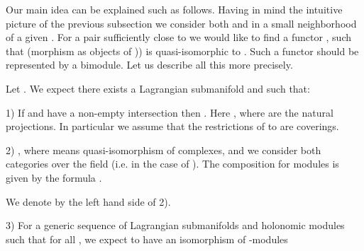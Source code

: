 \documentclass[a4paper,12pt]{article}
\begin{document}
Our main idea can be explained such as follows. Having in mind the intuitive picture of the previous
subsection we consider both \coordHE{} and \coordHE{} in a small
neighborhood of a given \coordHE{}. For a pair \coordHE{} sufficiently close to
\coordHE{} we would like to find a functor 
\coordHE{}, such
that \coordHE{} (morphism as objects of
\coordHE{})) is quasi-isomorphic to \coordHE{}.
Such a functor should be represented by a bimodule. Let us describe all this more precisely.



Let \coordHE{}.
We expect there exists a Lagrangian submanifold \coordHE{} and \coordHE{} such that:

1) If \coordHE{} and \coordHE{} have a non-empty intersection then
 \coordHE{}. Here \coordHE{}, where \coordHE{} are
the natural projections. In particular we assume that the restrictions of
\coordHE{} to \myHighlight{$\Lambda$}\coordHE{} are coverings.



2) \coordHE{}, where 
 \myHighlight{$\simeq$}\coordHE{} means  quasi-isomorphism
of complexes, and we consider both categories over the field \coordHE{}
(i.e. \coordHE{} in the case of \coordHE{}).
The composition \myHighlight{$\circ$}\coordHE{} for modules
is given by the formula
\coordHE{}.
 
We denote by \coordHE{} the left hand side of 2).



3) For a generic sequence of Lagrangian submanifolds \coordHE{}
and holonomic modules \coordHE{} such that \coordHE{}
for all \coordHE{}, we expect to have an isomorphism of \coordHE{}-modules
\end{document}
